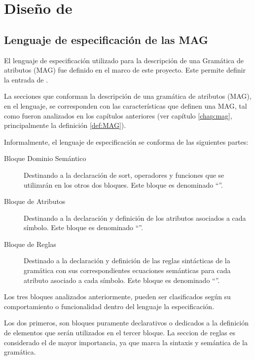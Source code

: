 \chapter{Diseño de \maggen}
\label{chap:disen_}
\minitoc

\section{Lenguaje de especificación de las MAG}
\label{sec:lenguajeMAG}

El lenguaje de especificación utilizado para la descripción de una Gramática de atributos (MAG) fue definido en el marco de este proyecto. Este permite definir la entrada de \maggen.
 
La secciones que conforman la descripción de una gramática de atributos (MAG), en el lenguaje, se corresponden con las características que definen una MAG, tal como fueron analizados en los capítulos anteriores (ver capítulo \ref{chap:mag}, principalmente la definición \ref{def:MAG}).
 
Informalmente, el lenguaje de especificación se conforma de las siguientes partes:

\begin{description}
\item [Bloque Dominio Semántico] Destinando a la declaración de sort, operadores y funciones que se utilizarán en los otros dos bloques. Este bloque es denominado ``''.

\item [Bloque de Atributos] Destinando a la declaración y definición de los atributos asociados a cada símbolo. Este bloque es denominado ``''.

\item [Bloque de Reglas] Destinado a la declaración y definición de las reglas sintácticas de la gramática con sus correspondientes ecuaciones semánticas para cada atributo asociado a cada símbolo. Este bloque es denominado ``''.
\end{description}

Los tres bloques analizados anteriormente, pueden ser clasificados según su comportamiento o funcionalidad dentro del lenguaje la especificación.

Los dos primeros, son bloques puramente declarativos o dedicados a la definición de elementos que serán utilizados en el tercer bloque. La seccion de reglas es considerado el de mayor importancia, ya que marca la sintaxis y semántica de la gramática.

